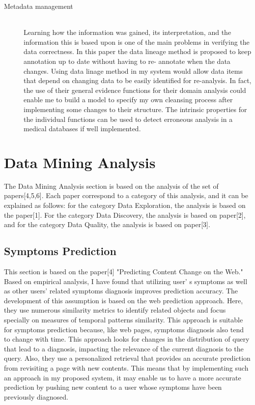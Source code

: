 \documentclass[sts]{sig-alternate}
\begin{document}
\begin{description}
  			\item[Metadata management]  \hfill \\			
  				Learning how the information was gained, its interpretation, and the information this is 				based upon is one of the main problems in verifying the data correctness. In this paper 					the data lineage method is proposed to keep annotation up to date without having to re-					annotate when the data changes. Using data linage method in my system would allow data 					items that depend on changing data to be easily identified for re-analysis. In fact, the 				use of their general evidence functions for their domain analysis could enable me to 						build a model to specify my own cleansing process after implementing some changes to 						their structure. The intrinsic properties for the individual functions can be used to 					detect erroneous analysis in a medical databases if well implemented.
  			
		\end{description}
			
\section{Data Mining Analysis}
	\label{Data Mining Analysis}
	
	The Data Mining Analysis section is based on the analysis of the set of papers[4,5,6]. Each paper 		correspond to a category of this analysis, and it can be explained as follows: for the category Data 	Exploration, the analysis is based on the paper[1]. For the category Data Discovery, the analysis is 	based on paper[2], and for the category Data Quality, the analysis is based on paper[3].
	
	\subsection{Symptoms Prediction}
		\label{Symptoms Prediction}
	
		This section is based on the paper[4] "Predicting Content Change on the Web." Based on empirical 		analysis, I have found that utilizing user' s symptoms as well as other users' related symptoms 			diagnosis improves prediction accuracy. The development of this assumption is based 	on the web 		prediction approach. Here, they use numerous similarity metrics to identify related objects and 			focus specially on measures of temporal patterns similarity. This approach is suitable for 				symptoms prediction because, like web pages, symptoms diagnosis also tend to change with time. 			This approach looks for changes in the distribution of query that lead to a diagnosis, impacting 		the relevance of the current diagnosis to the query. Also, they use a personalized retrieval 				that provides an accurate prediction from revisiting a page with new contents. This means that 			by implementing such an approach in my proposed system, it may 	enable us to have a more 				accurate prediction by pushing new content to a user whose symptoms have been previously 					diagnosed.\newline
\end{document}
